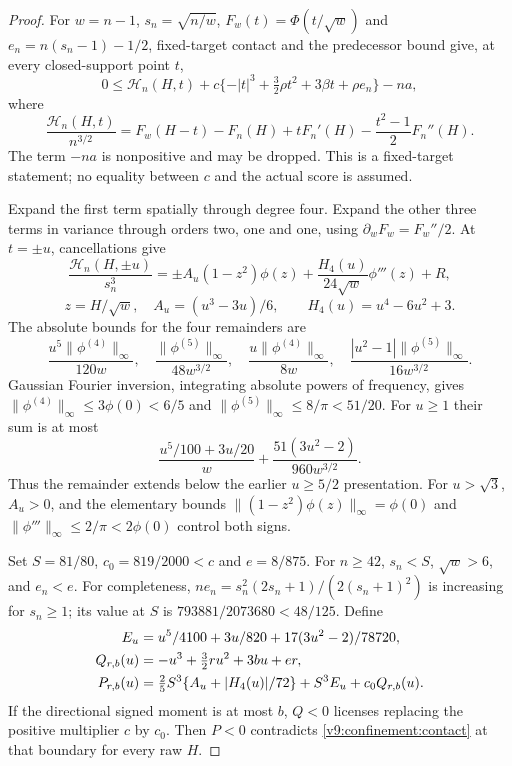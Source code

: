 \begin{proof}
For $w=n-1$, $s_n=\sqrt{n/w}$, $F_w(t)=\Phi(t/\sqrt w)$ and
$e_n=n(s_n-1)-1/2$, fixed-target contact and the predecessor bound give,
at every closed-support point $t$,
\begin{equation}\label{v9:confinement:contact}
 0\le\mathcal H_n(H,t)
       +c\{-|t|^3+\tfrac32\rho t^2+3\beta t+\rho e_n\}
       -na,
\end{equation}
where
\[
 \frac{\mathcal H_n(H,t)}{n^{3/2}}
 =F_w(H-t)-F_n(H)+tF_n'(H)-\frac{t^2-1}{2}F_n''(H).
\]
The term $-na$ is nonpositive and may be dropped. This is a
fixed-target statement; no equality between $c$ and the actual score is
assumed.

Expand the first term spatially through degree four. Expand the other
three terms in variance through orders two, one and one, using
$\partial_w F_w=F_w''/2$. At $t=\pm u$, cancellations give
\[
 \frac{\mathcal H_n(H,\pm u)}{s_n^3}
 =\pm A_u(1-z^2)\phi(z)
       +\frac{H_4(u)}{24\sqrt w}\phi'''(z)+R,
\]
\[
 z=H/\sqrt w,\quad A_u=(u^3-3u)/6,
 \qquad H_4(u)=u^4-6u^2+3.
\]
The absolute bounds for the four remainders are
\[
 \frac{u^5\|\phi^{(4)}\|_\infty}{120w},\quad
 \frac{\|\phi^{(5)}\|_\infty}{48w^{3/2}},\quad
 \frac{u\|\phi^{(4)}\|_\infty}{8w},\quad
 \frac{|u^2-1|\|\phi^{(5)}\|_\infty}{16w^{3/2}}.
\]
Gaussian Fourier inversion, integrating absolute powers of frequency,
gives $\|\phi^{(4)}\|_\infty\le3\phi(0)<6/5$ and
$\|\phi^{(5)}\|_\infty\le8/\pi<51/20$.
For $u\ge1$ their sum is at most
\[
 \frac{u^5/100+3u/20}{w}
      +\frac{51(3u^2-2)}{960w^{3/2}}.
\]
Thus the remainder extends below the earlier $u\ge5/2$ presentation.
For $u>\sqrt3$, $A_u>0$, and the elementary bounds
$\|(1-z^2)\phi(z)\|_\infty=\phi(0)$ and
$\|\phi'''\|_\infty\le2/\pi<2\phi(0)$ control both signs.

Set $S=81/80$, $c_0=819/2000<c$ and $e=8/875$.
For $n\ge42$, $s_n<S$, $\sqrt w>6$, and $e_n<e$.
For completeness,
$ne_n=s_n^2(2s_n+1)/(2(s_n+1)^2)$ is increasing for $s_n\ge1$;
its value at $S$ is $793881/2073680<48/125$.
Define
\begin{align}
 E_u&=u^5/4100+3u/820+17(3u^2-2)/78720,\notag\\
 Q_{r,b}(u)&=-u^3+\tfrac32ru^2+3bu+er,\label{v9:confinement:Q}\\
 P_{r,b}(u)&=\tfrac25S^3\{A_u+|H_4(u)|/72\}
                  +S^3 E_u+c_0Q_{r,b}(u).\label{v9:confinement:P}
\end{align}
If the directional signed moment is at most $b$, $Q<0$ licenses replacing
the positive multiplier $c$ by $c_0$. Then $P<0$ contradicts
\eqref{v9:confinement:contact} at that boundary for every raw $H$.


\end{proof}
